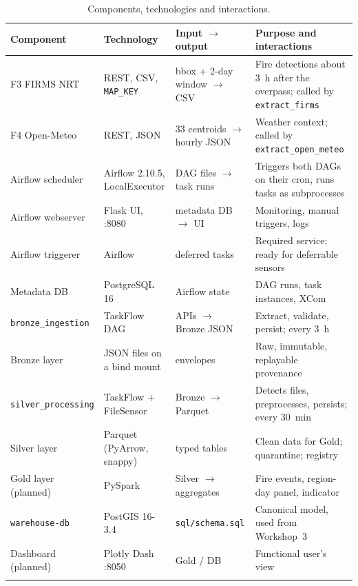 \documentclass[11pt,a4paper]{article}
\newcommand{\code}[1]{\texttt{\small #1}}
\begin{document}
\begin{longtable}{L{2.8cm}L{3.2cm}L{4.2cm}L{4.4cm}}
\toprule
\textbf{Component} & \textbf{Technology} & \textbf{Input $\rightarrow$ output} & \textbf{Purpose and interactions} \\
\midrule
\endhead
F3 FIRMS NRT & REST, CSV, \code{MAP\_KEY} & bbox + 2-day window $\rightarrow$ CSV & Fire detections about 3~h after the overpass; called by \code{extract\_firms} \\
F4 Open-Meteo & REST, JSON & 33 centroids $\rightarrow$ hourly JSON & Weather context; called by \code{extract\_open\_meteo} \\
Airflow scheduler & Airflow 2.10.5, LocalExecutor & DAG files $\rightarrow$ task runs & Triggers both DAGs on their cron, runs tasks as subprocesses \\
Airflow webserver & Flask UI, :8080 & metadata DB $\rightarrow$ UI & Monitoring, manual triggers, logs \\
Airflow triggerer & Airflow & deferred tasks & Required service; ready for deferrable sensors \\
Metadata DB & PostgreSQL 16 & Airflow state & DAG runs, task instances, XCom \\
\code{bronze\_ingestion} & TaskFlow DAG & APIs $\rightarrow$ Bronze JSON & Extract, validate, persist; every 3~h \\
Bronze layer & JSON files on a bind mount & envelopes & Raw, immutable, replayable provenance \\
\code{silver\_processing} & TaskFlow + FileSensor & Bronze $\rightarrow$ Parquet & Detects files, preprocesses, persists; every 30~min \\
Silver layer & Parquet (PyArrow, snappy) & typed tables & Clean data for Gold; quarantine; registry \\
Gold layer (planned) & PySpark & Silver $\rightarrow$ aggregates & Fire events, region-day panel, indicator \\
\code{warehouse-db} & PostGIS 16-3.4 & \code{sql/schema.sql} & Canonical model, used from Workshop~3 \\
Dashboard (planned) & Plotly Dash :8050 & Gold / DB & Functional user's view \\
\bottomrule
\caption{Components, technologies and interactions.}
\end{longtable}
\end{document}
